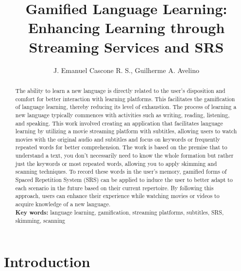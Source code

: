 \documentclass[12pt]{article}
\title{Gamified Language Learning: Enhancing Learning through Streaming Services and SRS}
\author{J. Emanuel Cascone R. S.\inst{1}, Guilherme A. Avelino\inst{1} }
\begin{document}
 

\maketitle

\begin{abstract} 
  The ability to learn a new language is directly related to the user's disposition and comfort for better interaction with learning platforms. This facilitates the gamification of language learning, thereby reducing its level of exhaustion. The process of learning a new language typically commences with activities such as writing, reading, listening, and speaking. This work involved creating an application that facilitates language learning by utilizing a movie streaming platform with subtitles, allowing users to watch movies with the original audio and subtitles and focus on keywords or frequently repeated words for better comprehension. The work is based on the premise that to understand a text, you don't necessarily need to know the whole formation but rather just the keywords or most repeated words, allowing you to apply skimming and scanning techniques. To record these words in the user's memory, gamified forms of Spaced Repetition System (SRS) can be applied to induce the user to better adapt to each scenario in the future based on their current repertoire. By following this approach, users can enhance their experience while watching movies or videos to acquire knowledge of a new language. \\
  \textbf{Key words:} language learning, gamification, streaming platforms, subtitles, SRS, skimming, scanning
\end{abstract} 
\newpage


\section{Introduction} 
\end{document}
